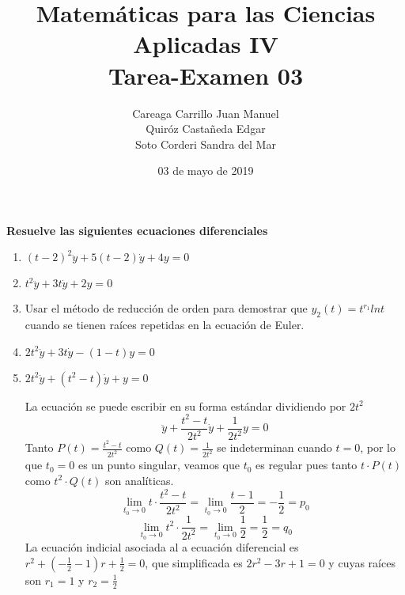 \documentclass{article}
\title{
    Matemáticas para las Ciencias Aplicadas IV\\
    Tarea-Examen 03 
}
\author{
    Careaga Carrillo Juan Manuel \\
    Quiróz Castañeda Edgar \\
    Soto Corderi Sandra del Mar
}
\date{
    03 de mayo de 2019
}
\begin{document}
    \maketitle
    {\bf Resuelve las siguientes ecuaciones diferenciales}
    \begin{enumerate}
        
        \item {
            $(t - 2)^2 \ddot y + 5(t-2)\dot y+4y=0$

            \color{azul}
            
        }
        \item {
            $t^2 \ddot y+ 3t \dot y + 2y =0$

            \color{azul}
            
        }
        \item {
            Usar el método de reducción de orden para demostrar que 
            $y_2(t) = t ^ {r_1} ln t$ cuando se tienen raíces repetidas en la 
            ecuación de Euler. 

            \color{azul}
           
        }
        \item {
            $2t^2\ddot y + 3t\dot y - (1 - t)y = 0$

            \color{azul}

        }

        \item {
            $2t^2\ddot y + (t^2 - t)\dot y + y = 0$

            \color{azul}
            La ecuación se puede escribir en su forma estándar dividiendo por $2t^2$
            \[
                \ddot y + \frac{t^2-t}{2t^2}\dot y + \frac{1}{2t^2}y = 0
            \]
            Tanto $P(t)=\frac{t^2-t}{2t^2}$ como $Q(t)=\frac{1}{2t^2}$ se indeterminan cuando $t=0$, por lo que $t_0=0$
            es un punto singular, veamos que $t_0$ es regular pues tanto $t\cdot P(t)$ como $t^2\cdot Q(t)$ son
            analíticas.
            \[
                \lim_{t_0 \to 0}{t\cdot\frac{t^2-t}{2t^2}}
                =\lim_{t_0\to 0}{\frac{t-1}{2}}
                =-\frac{1}{2}=p_0
            \]
            \[
                \lim_{t_0\to 0}{t^2\cdot\frac{1}{2t^2}}
                =\lim_{t_0\to 0}{\frac{1}{2}}
                =\frac{1}{2}=q_0
            \]
            La ecuación indicial asociada al a ecuación diferencial es $r^2+(-\frac{1}{2}-1)r+\frac{1}{2}=0$, que
            simplificada es $2r^2-3r+1=0$ y cuyas raíces son $r_1=1$ y $r_2=\frac{1}{2}$

}
\end{enumerate}
\end{document}
